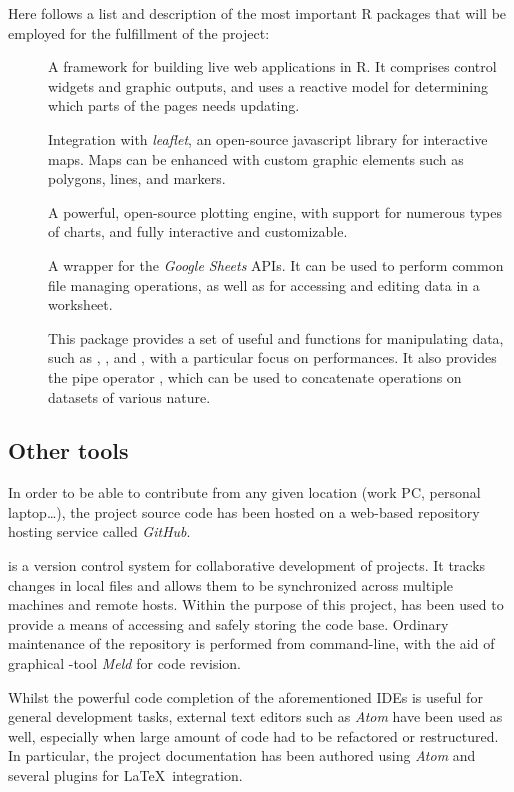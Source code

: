 Here follows a list and description of the most important R packages that will be employed for the fulfillment of the project:

\begin{description}
	\item[] A framework for building live web applications in R. It comprises control widgets and graphic outputs, and uses a reactive model for determining which parts of the pages needs updating.
	\item[] Integration with \emph{leaflet}, an open-source javascript library for interactive maps. Maps can be enhanced with custom graphic elements such as polygons, lines, and markers.
	\item[] A powerful, open-source plotting engine, with support for numerous types of charts, and fully interactive and customizable.
	\item[] A wrapper for the \emph{Google Sheets} APIs. It can be used to perform common file managing operations, as well as for accessing and editing data in a worksheet.
	\item[] This package provides a set of useful and functions for manipulating data, such as , , and , with a particular focus on performances. It also provides the pipe operator \code{\%>\%}, which can be used to concatenate operations on datasets of various nature.
\end{description}


\subsection{Other tools}
In order to be able to contribute from any given location (work PC, personal laptop\dots), the project source code has been hosted on a web-based  repository hosting service called \emph{GitHub}.

 is a version control system for collaborative development of projects.
It tracks changes in local files and allows them to be synchronized across multiple machines and remote hosts.
Within the purpose of this project,  has been used to provide a means of accessing and safely storing the code base.
Ordinary maintenance of the repository is performed from command-line, with the aid of graphical -tool \emph{Meld} for code revision.

Whilst the powerful code completion of the aforementioned IDEs is useful for general development tasks, external text editors such as \emph{Atom} have been used as well, especially when large amount of code had to be refactored or restructured.
In particular, the project documentation has been authored using \emph{Atom} and several plugins for \LaTeX\ integration.
